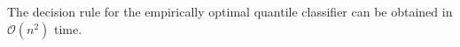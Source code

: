 \begin{proposition}
  \label{lem:optimal-quantile-time}
  The decision rule for the empirically optimal quantile classifier can be
  obtained in $\mathcal{O}(n^2)$ time.
\end{proposition}





